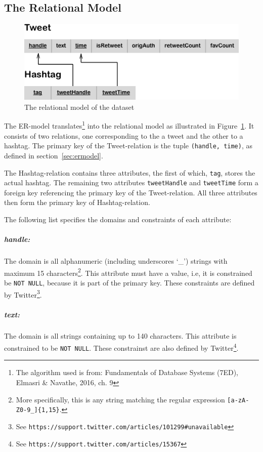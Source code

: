 \documentclass[a4paper, 12pt]{report}
\begin{document}
\subsection{The Relational Model}
\label{sec:relationalmodel}

\begin{figure}[b]
  \centering\includegraphics[scale = 0.8]{relationalModel.png}
  \caption{The relational model of the dataset}
  \label{fig:relationalmodel}
\end{figure}

The ER-model translates\footnote{The algorithm used is from: Fundamentals of Database Systems (7ED), Elmasri \& Navathe, 2016, ch. 9} into the relational model as illustrated in Figure~\ref{fig:relationalmodel}. It consists of two relations, one corresponding to the a tweet and the other to a hashtag. The primary key of the Tweet-relation is the tuple \texttt{(handle, time)}, as defined in section~\ref{sec:ermodel}.

The Hashtag-relation contains three attributes, the first of which, \texttt{tag}, stores the actual hashtag. The remaining two attributes \texttt{tweetHandle} and \texttt{tweetTime} form a foreign key referencing the primary key of the Tweet-relation. All three attributes then form the primary key of Hashtag-relation.

The following list specifies the domains and constraints of each attribute:

\subparagraph{handle:}
The domain is all alphanumeric (including underscores `\_') strings with maximum 15 characters\footnote{More specifically, this is any string matching the regular expression \verb+[a-zA-Z0-9_]{1,15}+.}. This attribute must have a value, i.e, it is constrained be \texttt{NOT NULL}, because it is part of the primary key. These constraints are defined by Twitter\footnote{See \verb+https://support.twitter.com/articles/101299#unavailable+}.

\subparagraph{text:}
The domain is all strings containing up to 140 characters. This attribute is constrained to be \texttt{NOT NULL}. These constrainst are also defined by Twitter\footnote{See \verb+https://support.twitter.com/articles/15367+}.
\end{document}
